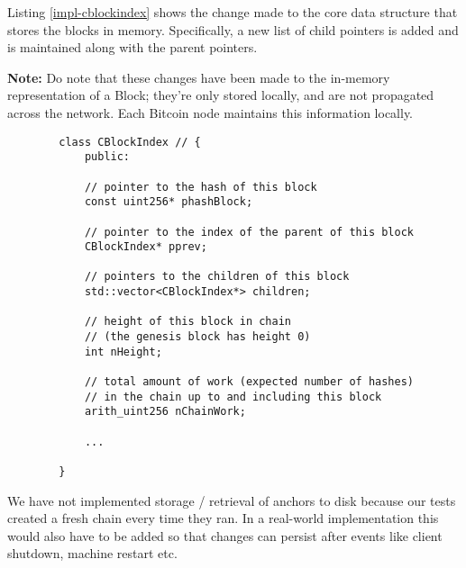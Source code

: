 Listing \ref{impl-cblockindex} shows the change made to the core data structure that stores the blocks in memory. Specifically, a new list of child pointers is added and is maintained along with the parent pointers.

\textbf{Note:} Do note that these changes have been made to the in-memory representation of a Block; they're only stored locally, and are not propagated across the network. Each Bitcoin node maintains this information locally.

\begin{listing}[!htb]
    \begin{verbatim}
        class CBlockIndex // {
            public:

            // pointer to the hash of this block
            const uint256* phashBlock;

            // pointer to the index of the parent of this block
            CBlockIndex* pprev;

            // pointers to the children of this block
            std::vector<CBlockIndex*> children;

            // height of this block in chain
            // (the genesis block has height 0)
            int nHeight;

            // total amount of work (expected number of hashes) 
            // in the chain up to and including this block
            arith_uint256 nChainWork;

            ...
            
        }
    \end{verbatim}

    \caption[Updated CBlockIndex which also stores a list of child pointers.]
    {
        Updated CBlockIndex which also stores a list of child pointers.
        \footnotesize
        Line 11 has been added. \\
        Snippet of code taken from Bitcoin Core source file \textit{src/chain.h}.
    }
    \label{impl-cblockindex}
\end{listing}



We have not implemented storage / retrieval of anchors to disk because our tests created a fresh chain every time they ran. 
In a real-world implementation this would also have to be added so that changes can persist after events like client shutdown, machine restart etc.

